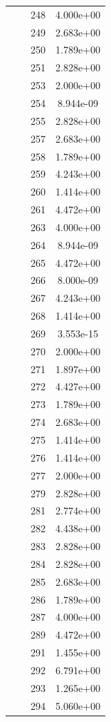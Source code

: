 \documentclass[12pt]{article}
\begin{document}
\begin{longtable}{@{}cccc@{}}
 &  & 248 & 4.000e+00 \\
 &  & 249 & 2.683e+00 \\
 &  & 250 & 1.789e+00 \\
 &  & 251 & 2.828e+00 \\
 &  & 253 & 2.000e+00 \\
 &  & 254 & 8.944e-09 \\
 &  & 255 & 2.828e+00 \\
 &  & 257 & 2.683e+00 \\
 &  & 258 & 1.789e+00 \\
 &  & 259 & 4.243e+00 \\
 &  & 260 & 1.414e+00 \\
 &  & 261 & 4.472e+00 \\
 &  & 263 & 4.000e+00 \\
 &  & 264 & 8.944e-09 \\
 &  & 265 & 4.472e+00 \\
 &  & 266 & 8.000e-09 \\
 &  & 267 & 4.243e+00 \\
 &  & 268 & 1.414e+00 \\
 &  & 269 & 3.553e-15 \\
 &  & 270 & 2.000e+00 \\
 &  & 271 & 1.897e+00 \\
 &  & 272 & 4.427e+00 \\
 &  & 273 & 1.789e+00 \\
 &  & 274 & 2.683e+00 \\
 &  & 275 & 1.414e+00 \\
 &  & 276 & 1.414e+00 \\
 &  & 277 & 2.000e+00 \\
 &  & 279 & 2.828e+00 \\
 &  & 281 & 2.774e+00 \\
 &  & 282 & 4.438e+00 \\
 &  & 283 & 2.828e+00 \\
 &  & 284 & 2.828e+00 \\
 &  & 285 & 2.683e+00 \\
 &  & 286 & 1.789e+00 \\
 &  & 287 & 4.000e+00 \\
 &  & 289 & 4.472e+00 \\
 &  & 291 & 1.455e+00 \\
 &  & 292 & 6.791e+00 \\
 &  & 293 & 1.265e+00 \\
 &  & 294 & 5.060e+00 \\

\end{longtable}
\end{document}
